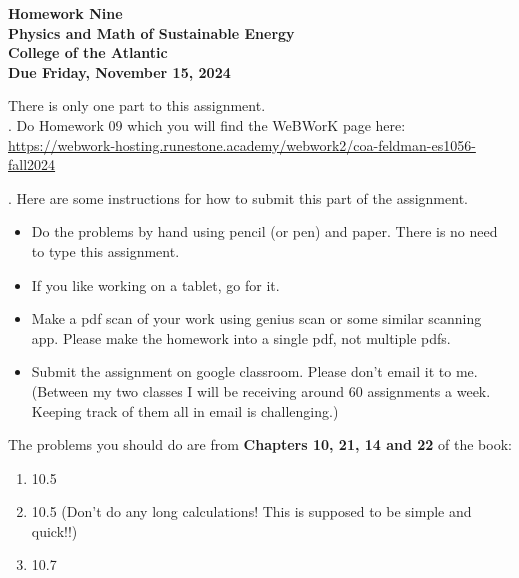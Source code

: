 \documentclass[12pt]{article}
\begin{document}
\pagestyle{empty}
 
\begin{center}
{\LARGE {\bf Homework Nine}}\\
\bigskip
{\Large {\bf Physics and Math of Sustainable Energy}}\\
\bigskip
{\Large {\bf College of the Atlantic}}\\
\bigskip
{ {\bf Due Friday, November 15, 2024}}\\ 
\end{center}
\medskip


\noindent There is only one part to this assignment.\\

.
Do Homework 09 which you will find the WeBWorK page here:
\url{https://webwork-hosting.runestone.academy/webwork2/coa-feldman-es1056-fall2024}


.  Here are some
instructions for how to submit this part of the assignment.
\begin{itemize}
\item Do the problems by hand using pencil (or pen) and paper.
  There is no need to type this assignment.
\item If you like working on a tablet, go for it. 
\item Make a pdf scan of your work using genius scan or some
  similar scanning app.  Please make the homework into a single
  pdf, not multiple pdfs.
\item Submit the assignment on google classroom.  Please don't
  email it to me.  (Between my two classes I will be receiving
  around 60 assignments a week.  Keeping track of them all in email 
  is challenging.)\\
\end{itemize}



\noindent The problems you should do are from {\bf Chapters 10, 21, 14
  and 22} of the book:  \\  

\begin{enumerate}
  \setlength{\itemsep}{-1mm}
\item 10.5
\item 10.5 (Don't do any long calculations! This is supposed to be
  simple and quick!!) 
\item 10.7
\end{enumerate}
\end{document}
